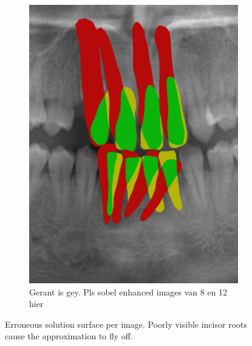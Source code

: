 \documentclass[a4paper,titlepage,12pt]{article}
\begin{document}
\begin{figure}
\begin{subfigure}{0.48\linewidth}
		\includegraphics[width=0.48\columnwidth]{results/12i50}
		\caption{Gerant is gey. Pls sobel enhanced images van 8 en 12 hier}
	\end{subfigure}
	\caption{Erroneous solution surface per image. Poorly visible incisor roots cause the approximation to fly off. }
	\label{fig:sol}
\end{figure}



\end{document}
